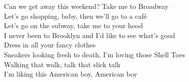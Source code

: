 Can we get away this weekend? Take me to Broadway \\
Let's go shopping, baby, then we'll go to a café \\
Let's go on the subway, take me to your hood \\
I never been to Brooklyn and I'd like to see what's good \\
Dress in all your fancy clothes \\
Sneakers looking fresh to death, I'm loving those Shell Toes \\
Walking that walk, talk that slick talk \\
I'm liking this American boy, American boy

